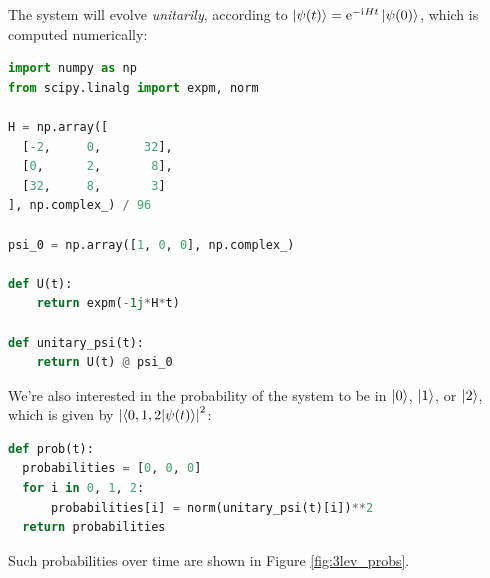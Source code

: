 The system will evolve \emph{unitarily}, according to $\ket{\psi(t)} = \mathrm{e}^{-\mathrm{i}\mkern1mu H t} \ket{\psi(0)}$,
which is computed numerically:
\begin{lstlisting}[language=Python]
import numpy as np
from scipy.linalg import expm, norm

H = np.array([
  [-2,     0,      32],
  [0,      2,       8],
  [32,     8,       3]
], np.complex_) / 96

psi_0 = np.array([1, 0, 0], np.complex_)

def U(t):
    return expm(-1j*H*t)

def unitary_psi(t):
    return U(t) @ psi_0
\end{lstlisting}

We're also interested in the probability of the system to be in $\ket{0}$, $\ket{1}$, or $\ket{2}$,
which is given by $\abs{\braket{0, 1, 2}{\psi(t)}}^2$:
\begin{lstlisting}[language=Python]
def prob(t):
  probabilities = [0, 0, 0]
  for i in 0, 1, 2:
      probabilities[i] = norm(unitary_psi(t)[i])**2
  return probabilities
\end{lstlisting}
Such probabilities over time are shown in Figure \ref{fig:3lev_probs}. 
